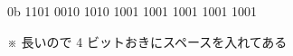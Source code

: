 \begin{center}
0b 1101 0010 1010 1001 1001 1001 1001 1001

\noindent ※ 長いので 4 ビットおきにスペースを入れてある
\end{center}
